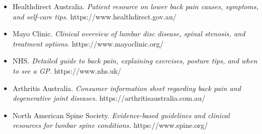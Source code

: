 \begin{itemize}
    \item Healthdirect Australia. \textit{Patient resource on lower back pain causes, symptoms, and self-care tips.} https://www.healthdirect.gov.au/
    \item Mayo Clinic. \textit{Clinical overview of lumbar disc disease, spinal stenosis, and treatment options.} https://www.mayoclinic.org/
    \item NHS. \textit{Detailed guide to back pain, explaining exercises, posture tips, and when to see a GP.} https://www.nhs.uk/
    \item Arthritis Australia. \textit{Consumer information sheet regarding back pain and degenerative joint diseases.} https://arthritisaustralia.com.au/
    \item North American Spine Society. \textit{Evidence-based guidelines and clinical resources for lumbar spine conditions.} https://www.spine.org/
\end{itemize}
